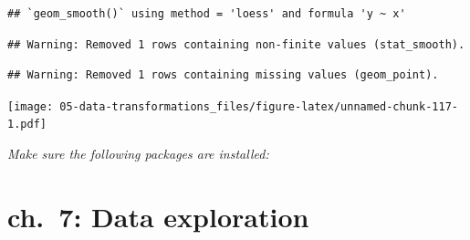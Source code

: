 \documentclass[]{book}
\newenvironment{Shaded}{\begin{snugshade}}{\end{snugshade}}
\newcommand{\DataTypeTok}[1]{\textcolor[rgb]{0.13,0.29,0.53}{#1}}
\newcommand{\KeywordTok}[1]{\textcolor[rgb]{0.13,0.29,0.53}{\textbf{#1}}}
\newcommand{\NormalTok}[1]{#1}
\newcommand{\OperatorTok}[1]{\textcolor[rgb]{0.81,0.36,0.00}{\textbf{#1}}}
\newcommand{\OtherTok}[1]{\textcolor[rgb]{0.56,0.35,0.01}{#1}}
\newcommand{\StringTok}[1]{\textcolor[rgb]{0.31,0.60,0.02}{#1}}
\theoremstyle{definition}
\theoremstyle{definition}
\theoremstyle{definition}
\theoremstyle{remark}
\begin{document}
\begin{Shaded}
\end{Shaded}

\begin{verbatim}
## `geom_smooth()` using method = 'loess' and formula 'y ~ x'
\end{verbatim}

\begin{verbatim}
## Warning: Removed 1 rows containing non-finite values (stat_smooth).
\end{verbatim}

\begin{verbatim}
## Warning: Removed 1 rows containing missing values (geom_point).
\end{verbatim}

\texttt{[image: 05-data-transformations\_files/figure-latex/unnamed-chunk-117-1.pdf]}

\emph{Make sure the following packages are installed:}

\hypertarget{ch.-7-data-exploration}{%
\chapter{ch.~7: Data exploration}\label{ch.-7-data-exploration}}
\end{document}
